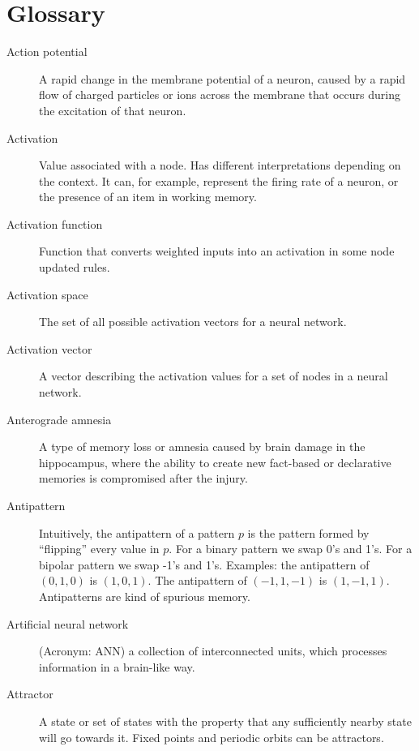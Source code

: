 \chapter{Glossary}

\begin{description}

\item[Action potential] A rapid change in the membrane potential of a neuron, caused by a rapid flow of charged particles or ions across the membrane that occurs during the excitation of that neuron.

\item[Activation] Value associated with a node. Has different interpretations depending on the context. It can, for example, represent the firing rate of a neuron, or the presence of an item in working memory.

\item[Activation function] Function that converts weighted inputs into an activation in some node updated rules.

\item[Activation space] The set of all possible activation vectors for a neural network.

\item[Activation vector] A vector describing the activation values for a set of nodes in a neural network.


\item[Anterograde amnesia] A type of memory loss or amnesia caused by brain damage in the hippocampus, where the ability to create new fact-based or declarative memories is compromised after the injury. 

\item[Antipattern] Intuitively, the antipattern of a pattern $p$ is the pattern formed by ``flipping'' every value in $p$.  For a binary pattern we swap 0's and 1's. For a bipolar pattern we swap -1's and 1's. Examples: the antipattern of $(0,1,0)$ is  $(1,0,1)$. The antipattern of $(-1,1,-1)$ is  $(1,-1,1)$. Antipatterns are  kind of spurious memory.

\item[Artificial neural network] (Acronym: ANN) a collection of interconnected units, which processes information in a brain-like way.

\item[Attractor] A state or set of states with the property that any  sufficiently nearby state will go towards it. Fixed points and periodic orbits can be attractors.


\end{description}
